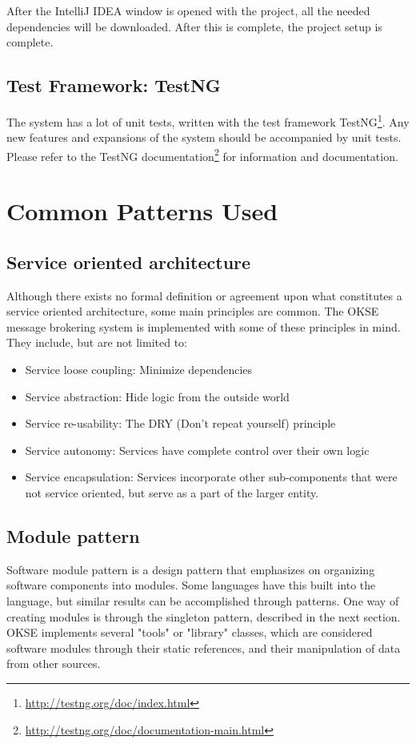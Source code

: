 After the IntelliJ IDEA window is opened with the project, all the needed dependencies will be downloaded. After this is complete, the project setup is complete.

\subsection{Test Framework: TestNG}
The system has a lot of unit tests, written with the test framework TestNG\footnote{\url{http://testng.org/doc/index.html}}. Any new features and expansions of the system should be accompanied by unit tests. Please refer to the TestNG documentation\footnote{\url{http://testng.org/doc/documentation-main.html}} for information and documentation.

\section{Common Patterns Used}
\label{sec:common-patterns-used}

\subsection{Service oriented architecture}

Although there exists no formal definition or agreement upon what constitutes a service oriented architecture, some main principles are common. The OKSE message brokering system is implemented with some of these principles in mind. They include, but are not limited to:

\begin{itemize}
\item Service loose coupling: Minimize dependencies
\item Service abstraction: Hide logic from the outside world
\item Service re-usability: The DRY (Don't repeat yourself) principle
\item Service autonomy: Services have complete control over their own logic
\item Service encapsulation: Services incorporate other sub-components that were not service oriented, but serve as a part of the larger entity.
\end{itemize}

\subsection{Module pattern}

Software module pattern is a design pattern that emphasizes on organizing software components into modules. Some languages have this built into the language, but similar results can be accomplished through patterns. One way of creating modules is through the singleton pattern, described in the next section. OKSE implements several "tools" or "library" classes, which are considered software modules through their static references, and their manipulation of data from other sources.

